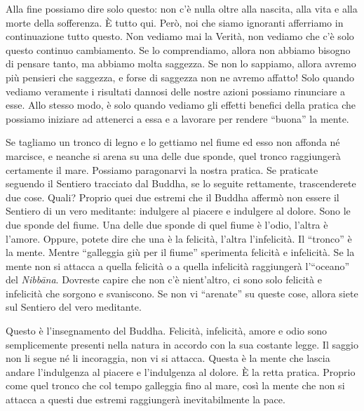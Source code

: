 Alla fine possiamo dire solo questo: non c'è nulla oltre alla nascita,
alla vita e alla morte della sofferenza. È tutto qui. Però, noi che
siamo ignoranti afferriamo in continuazione tutto questo. Non vediamo
mai la Verità, non vediamo che c'è solo questo continuo cambiamento. Se
lo comprendiamo, allora non abbiamo bisogno di pensare tanto, ma abbiamo
molta saggezza. Se non lo sappiamo, allora avremo più pensieri che
saggezza, e forse di saggezza non ne avremo affatto! Solo quando vediamo
veramente i risultati dannosi delle nostre azioni possiamo rinunciare a
esse. Allo stesso modo, è solo quando vediamo gli effetti benefici della
pratica che possiamo iniziare ad attenerci a essa e a lavorare per
rendere ``buona'' la mente.

Se tagliamo un tronco di legno e lo gettiamo nel fiume ed esso non
affonda né marcisce, e neanche si arena su una delle due sponde, quel
tronco raggiungerà certamente il mare. Possiamo paragonarvi la nostra
pratica. Se praticate seguendo il Sentiero tracciato dal Buddha, se lo
seguite rettamente, trascenderete due cose. Quali? Proprio quei due
estremi che il Buddha affermò non essere il Sentiero di un vero
meditante: indulgere al piacere e indulgere al dolore. Sono le due
sponde del fiume. Una delle due sponde di quel fiume è l'odio, l'altra è
l'amore. Oppure, potete dire che una è la felicità, l'altra
l'infelicità. Il ``tronco'' è la mente. Mentre ``galleggia giù per il
fiume'' sperimenta felicità e infelicità. Se la mente non si attacca a
quella felicità o a quella infelicità raggiungerà l'``oceano'' del
\emph{Nibbāna}. Dovreste capire che non c'è nient'altro, ci sono solo
felicità e infelicità che sorgono e svaniscono. Se non vi ``arenate'' su
queste cose, allora siete sul Sentiero del vero meditante.

Questo è l'insegnamento del Buddha. Felicità, infelicità, amore e odio
sono semplicemente presenti nella natura in accordo con la sua costante
legge. Il saggio non li segue né li incoraggia, non vi si attacca.
Questa è la mente che lascia andare l'indulgenza al piacere e
l'indulgenza al dolore. È la retta pratica. Proprio come quel tronco che
col tempo galleggia fino al mare, così la mente che non si attacca a
questi due estremi raggiungerà inevitabilmente la pace.

